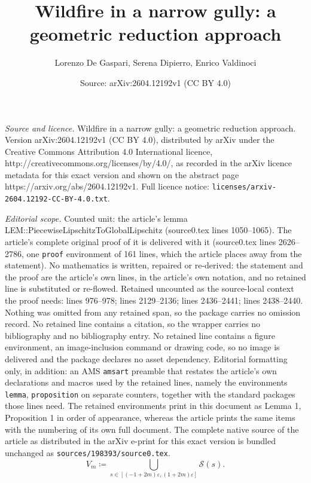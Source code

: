 \documentclass[10pt,a4paper]{amsart}
\title{Wildfire in a narrow gully: a geometric reduction approach}
\author{Lorenzo De Gaspari, Serena Dipierro, Enrico Valdinoci}
\date{Source: arXiv:2604.12192v1 (CC BY 4.0)}
\newcommand{\eps}{\varepsilon}
\begin{document}
\maketitle

\noindent\emph{Source and licence.} Wildfire in a narrow gully: a geometric reduction approach. Version arXiv:2604.12192v1 (CC BY 4.0), distributed by arXiv under the Creative Commons Attribution 4.0 International licence, http://creativecommons.org/licenses/by/4.0/, as recorded in the arXiv licence metadata for this exact version and shown on the abstract page https://arxiv.org/abs/2604.12192v1. Full licence notice: \texttt{licenses/arxiv-2604.12192-CC-BY-4.0.txt}.\par\smallskip

\noindent\textit{Editorial scope.} Counted unit: the article's lemma LEM::PiecewiseLipschitzToGlobalLipschitz (source0.tex lines 1050--1065). The article's complete original proof of it is delivered with it (source0.tex lines 2626--2786, one \texttt{proof} environment of 161 lines, which the article places away from the statement). No mathematics is written, repaired or re-derived: the statement and the proof are the article's own lines, in the article's own notation, and no retained line is substituted or re-flowed.  Retained uncounted as the source-local context the proof needs: lines 976--978; lines 2129--2136; lines 2436--2441; lines 2438--2440.  Nothing was omitted from any retained span, so the package carries no omission record.  No retained line contains a citation, so the wrapper carries no bibliography and no bibliography entry.  No retained line contains a figure environment, an image-inclusion command or drawing code, so no image is delivered and the package declares no asset dependency.  Editorial formatting only, in addition: an AMS \texttt{amsart} preamble that restates the article's own declarations and macros used by the retained lines, namely the environments \texttt{lemma}, \texttt{proposition} on separate counters, together with the standard packages those lines need.  The retained environments print in this document as Lemma 1, Proposition 1 in order of appearance, whereas the article prints the same items with the numbering of its own full document.  The complete native source of the article as distributed in the arXiv e-print for this exact version is bundled unchanged as \texttt{sources/198393/source0.tex}.
    \begin{equation}\label{EQ::VkDefinition}
        V_m \coloneq \bigcup_{s \in [(-1+2m)\eps, (1+2m)\eps]} \mathcal{S}(s).
    \end{equation}
\end{document}
